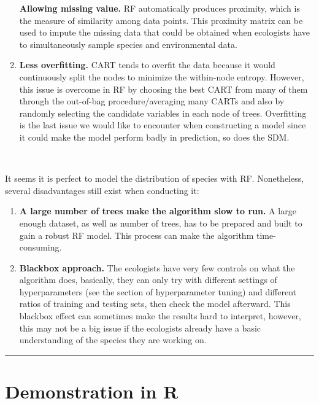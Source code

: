 \documentclass[
]{article}
\begin{document}
\begin{enumerate}
  \textbf{Allowing missing value.} RF automatically produces proximity,
  which is the measure of similarity among data points. This proximity
  matrix can be used to impute the missing data that could be obtained
  when ecologists have to simultaneously sample species and
  environmental data.
\item
  \textbf{Less overfitting.} CART tends to overfit the data because it
  would continuously split the nodes to minimize the within-node
  entropy. However, this issue is overcome in RF by choosing the best
  CART from many of them through the out-of-bag procedure/averaging many
  CARTs and also by randomly selecting the candidate variables in each
  node of trees. Overfitting is the last issue we would like to
  encounter when constructing a model since it could make the model
  perform badly in prediction, so does the SDM.
\end{enumerate}

~

It seems it is perfect to model the distribution of species with RF.
Nonetheless, several disadvantages still exist when conducting it:

\begin{enumerate}
\def\labelenumi{\arabic{enumi}.}
\item
  \textbf{A large number of trees make the algorithm slow to run.} A
  large enough dataset, as well as number of trees, has to be prepared
  and built to gain a robust RF model. This process can make the
  algorithm time-consuming.
\item
  \textbf{Blackbox approach.} The ecologists have very few controls on
  what the algorithm does, basically, they can only try with different
  settings of hyperparameters (see the section of hyperparameter tuning)
  and different ratios of training and testing sets, then check the
  model afterward. This blackbox effect can sometimes make the results
  hard to interpret, however, this may not be a big issue if the
  ecologists already have a basic understanding of the species they are
  working on.
\end{enumerate}

\begin{center}\rule{0.5\linewidth}{0.5pt}\end{center}

\hypertarget{demonstration-in-r}{%
\section{Demonstration in R}\label{demonstration-in-r}}
\end{document}
